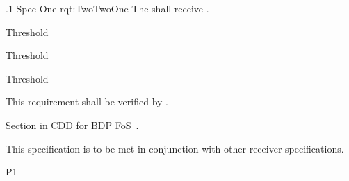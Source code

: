 \ONERQMTV
{\RqtNumberBase.1}
{\ThisSubSegment Spec One}
{rqt:TwoTwoOne}
{The \ThisSys shall receive \TBD.}
{
	\item [Light]  Threshold
	\item [Medium] Threshold
	\item [Heavy]  Threshold
}
{This requirement shall be verified by \TBD.}
{
\item [5.6.1] Section in CDD for BDP FoS~\cite{ref__BDP_FOS_CDD}.
}
{
	\item This specification is to be met in conjunction with other receiver specifications.
}
{P1}

